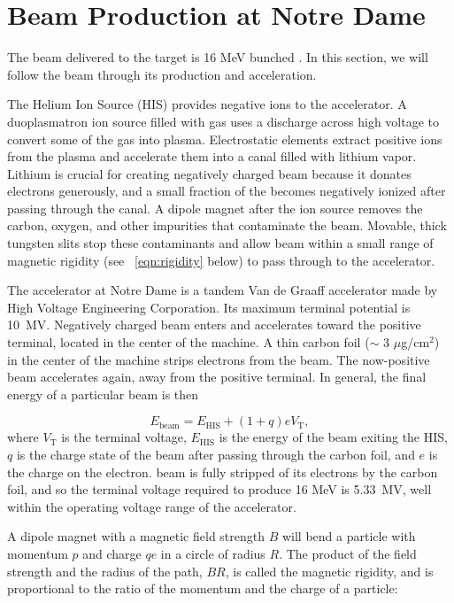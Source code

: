 \section{Beam Production at Notre Dame}
The beam delivered to the target is 16 MeV bunched .  In this section, we will follow the beam through its production and acceleration.

The Helium Ion Source (HIS) provides negative  ions to the accelerator.  A duoplasmatron ion source filled with  gas uses a discharge across high voltage to convert some of the gas into plasma.  Electrostatic elements extract positive  ions from the plasma and accelerate them into a canal filled with lithium vapor.  Lithium is crucial for creating negatively charged beam because it donates electrons generously, and a small fraction of the  becomes negatively ionized after passing through the canal.  A dipole magnet after the ion source removes the carbon, oxygen, and other impurities that contaminate the  beam.  Movable, thick tungsten slits stop these contaminants and allow beam within a small range of magnetic rigidity (see {\eqn}~\ref{eqn:rigidity} below) to pass through to the accelerator.

The accelerator at Notre Dame is a tandem Van de Graaff accelerator made by High Voltage Engineering Corporation.  Its maximum terminal potential is 10~MV.  Negatively charged beam enters and accelerates toward the positive terminal, located in the center of the machine. A thin carbon foil ($\sim$ 3 $\mu$g/cm$^2$) in the center of the machine strips electrons from the beam.  The now-positive beam accelerates again, away from the positive terminal. In general, the final energy of a particular beam is then

\begin{equation}
E_{\text{beam}} = E_{\text{HIS}} + (1+q)eV_{\text{T}},
\label{eqn:beamEnergy}
\end{equation}
where $V_{\text{T}}$ is the terminal voltage, $E_{\text{HIS}}$ is the energy of the beam exiting the HIS, $q$ is the charge state of the beam after passing through the carbon foil, and $e$ is the charge on the electron.   beam is fully stripped of its electrons by the carbon foil, and so the terminal voltage required to produce 16 MeV  is 5.33~MV, well within the operating voltage range of the accelerator.    

A dipole magnet with a magnetic field strength $B$ will bend a particle with momentum $p$ and charge $qe$ in a circle of radius $R$.  The product of the field strength and the radius of the path, $BR$, is called the magnetic rigidity, and is proportional to the ratio of the momentum and the charge of a particle:

